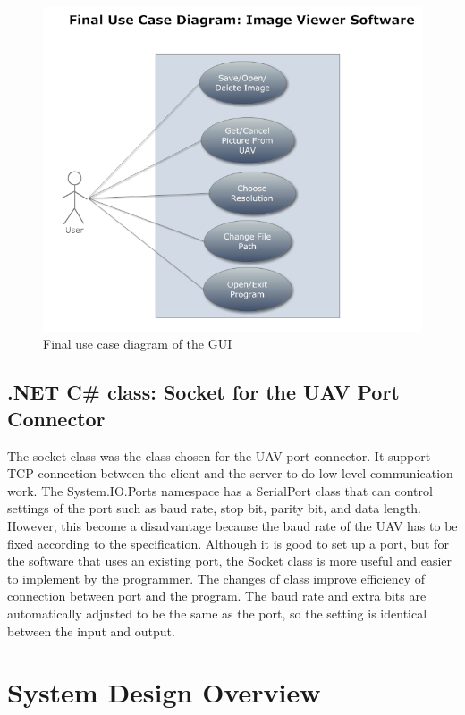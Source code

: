 \begin{figure}[!hbtp]
\begin{center}
\includegraphics[scale=0.7]{figures/FinaluserCase.png} 
\end{center}
\caption{Final use case diagram of the GUI\label{GUI_finalUseCase}}
\end{figure}

\subsection{.NET C\# class: Socket for the UAV Port Connector}
The socket class was the class chosen for the UAV port connector. It support TCP connection between the client and the server to do low level communication work\cite{xiaX}. The System.IO.Ports namespace has a SerialPort class that can control settings of the port such as baud rate, stop bit, parity bit, and data length. However, this become a disadvantage because the baud rate of the UAV has to be fixed according to the specification. Although it is good to set up a port, but for the software that uses an existing port, the Socket class is more useful and easier to implement by the programmer. The changes of class improve efficiency of connection between port and the program. The baud rate and extra bits are automatically adjusted to be the same as the port, so the setting is identical between the input and output. 





\section{System Design Overview}

